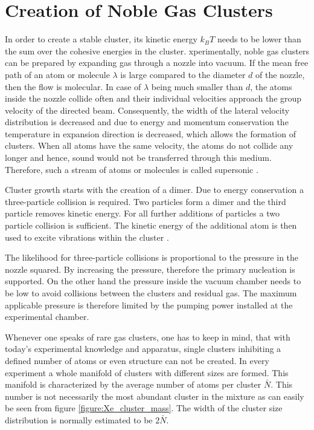 \section{Creation of Noble Gas Clusters}
In order to create a stable cluster, its kinetic energy $k_BT$ needs to be lower
than the sum over the cohesive energies in the cluster.
xperimentally, noble gas clusters can be prepared by expanding gas
through a nozzle into vacuum.
If the mean free path of an atom or molecule
$\lambda$ is large compared to the diameter $d$ of the nozzle, then the flow is
molecular. In case of $\lambda$ being much smaller than $d$, the atoms inside
the nozzle collide often and their individual velocities approach the group
velocity of the directed beam.
Consequently, the width of the lateral velocity
distribution is decreased and due to energy and momentum conservation the temperature
in expansion direction is decreased, which allows the formation of clusters.
When all atoms have the same velocity, the atoms do not collide any longer
and hence, sound would not be transferred through this medium. Therefore,
such a stream of atoms or molecules is called supersonic \cite{Moore09}.

Cluster growth starts with the creation of a dimer. Due to energy conservation
a three-particle collision is required. Two particles form a dimer and the
third particle removes kinetic energy. For all further additions of particles
a two particle collision is sufficient. The kinetic energy of the additional
atom is then used to excite vibrations within the cluster \cite{Soler82}.

The likelihood for three-particle collisions is proportional to the pressure
in the nozzle squared. By increasing the pressure, therefore the 
primary nucleation is supported. On the other hand the 
pressure inside the vacuum chamber needs to be low to avoid collisions
between the clusters and residual gas. The maximum applicable pressure is
therefore limited by the pumping power installed at the experimental chamber.

Whenever one speaks of rare gas clusters, one has to keep in mind, that
with today's experimental knowledge and apparatus, single clusters
inhibiting a defined number of atoms or even structure can not be created.
In every experiment a whole manifold of clusters with different sizes are
formed. This manifold is characterized by the average number of atoms
per cluster $\bar{N}$. This number is not necessarily the most abundant
cluster in the mixture as can easily be seen from
figure \ref{figure:Xe_cluster_mass}.
The width of the cluster size distribution is normally estimated to be
$2\bar{N}$.

